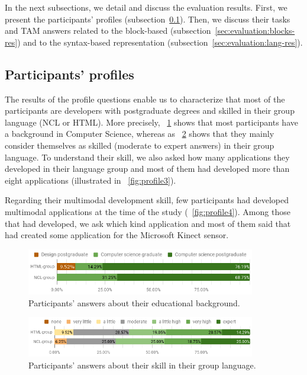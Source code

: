 \documentclass[
  doutorado,
  american
]{ThesisPUC}
\newcommand{\fig}[1]{\figurename~\ref{#1}}
\newcommand{\subsect}[1]{subsection~\ref{#1}}
\newcommand{\captionvspace}{\vspace{-1.3em}}
\begin{document}
In the next subsections, we detail and discuss the evaluation results. First, we
present the participants’ profiles (\subsect{sec:evaluation:profile-res}). 
Then, we discuss their tasks and TAM answers related to the block-based 
(\subsect{sec:evaluation:blocks-res}) and to the syntax-based representation 
(\subsect{sec:evaluation:lang-res}). 

\subsection{Participants’ profiles }
\label{sec:evaluation:profile-res}

The results of the profile questions enable us to characterize that most of the
participants are developers with postgraduate degrees and skilled in their group
language (NCL or HTML). More precisely, \fig{fig:profile1} shows that most
participants have a background in Computer Science, whereas as 
\fig{fig:profile2} shows that they mainly consider themselves as skilled
(moderate to expert answers) in their group language. To understand their skill,
we also asked how many applications they developed in their language group and
most of them had developed more than eight applications (illustrated in
\fig{fig:profile3}). 

Regarding their multimodal development skill, few participants had developed 
multimodal applications at the time of the study (\fig{fig:profile4}). Among 
those that had developed, we ask which kind application and most of them said 
that had created some application for the Microsoft Kinect sensor.

\begin{figure}[!ht]
\begin{center}
	\includegraphics[width=10cm, keepaspectratio]{img/img16.png}
	\caption{Participants’ answers about their educational background.}
	\label{fig:profile1}
    \captionvspace
\end{center}
\end{figure}

\begin{figure}[!ht]
\begin{center}
	\includegraphics[width=10cm, keepaspectratio]{img/img17.png}
	\caption{Participants’ answers about their skill in their group language.}
	\label{fig:profile2}
    \captionvspace
\end{center}
\end{figure}
\end{document}
